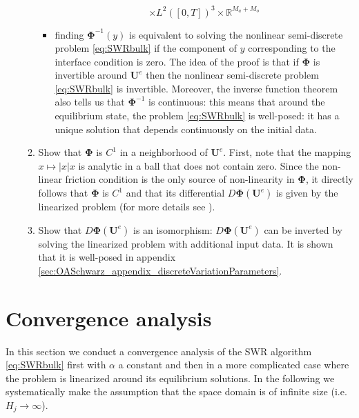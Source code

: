 \begin{enumerate}
\begin{enumerate}
\begin{itemize}
\begin{equation}
 			\times L^2([0,T])^{3}
			\times \mathbb{R}^{M_a+M_o}
 	\end{equation}
\item 
finding $\mathbf{\Phi}^{-1}(y)$ is equivalent
to solving the nonlinear semi-discrete problem
\eqref{eq:SWRbulk} if the component of $y$ corresponding
to the interface condition is zero.
The idea of the proof is that if $\mathbf{\Phi}$ is invertible
around $\mathbf{U}^e$ then the nonlinear semi-discrete problem
\eqref{eq:SWRbulk} is invertible.
Moreover, the inverse function theorem also tells us that
$\mathbf{\Phi}^{-1}$ is continuous:
this means that around
the equilibrium state, the problem \eqref{eq:SWRbulk} is well-posed:
it has a unique solution that depends continuously
on the initial data.
\end{itemize}
		\item Show that $\mathbf{\Phi}$ is $C^1$ in a
			neighborhood of $\mathbf{U}^e$.
			First, note that the mapping
			$x \mapsto |x|x$ is analytic in a
			ball that does not contain zero.
			Since the non-linear friction condition
			is the only source of
			non-linearity in $\mathbf{\Phi}$,
			it directly follows that
			$\mathbf{\Phi}$ is $C^1$ and that
			its differential
			$D\mathbf{\Phi}(\mathbf{U}^e)$ is given
			by the linearized problem (for more
			details see
			\cite{chacon-rebollo_existence_2014}).
		\item Show that $D\mathbf{\Phi}(\mathbf{U}^e)$
		is an isomorphism:
		$D\mathbf{\Phi}(\mathbf{U}^e)$ can
		be inverted by solving the linearized problem
		with additional input data.
		It is shown
		that it is well-posed in appendix
		\ref{sec:OASchwarz_appendix_discreteVariationParameters}.
	\end{enumerate}
\end{enumerate}

\section{Convergence analysis} \label{sec:conv-lin}
In this section we conduct a convergence analysis of the SWR algorithm 
\eqref{eq:SWRbulk} first with $\alpha$ a constant and then in a more 
complicated case where the problem is linearized around its 
equilibrium solutions. In the following we systematically make the assumption 
that the space domain is of infinite size (i.e. $H_j\to\infty$).
